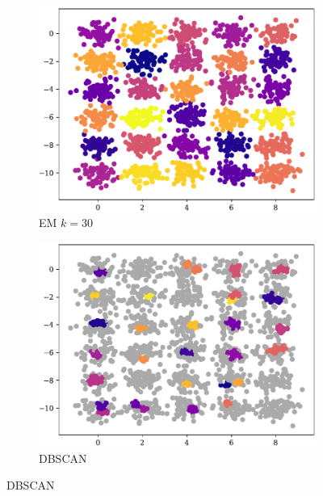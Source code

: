 \begin{figure}[t!]
\begin{subfigure}[b]{0.45\textwidth}
        \includegraphics[width=\textwidth]{../plots/30-30_pred_em.pdf}
        \caption{EM $k = 30$}
        \label{subfig:30-30-em}
    \end{subfigure}
    \hspace{0.09\textwidth}
    \begin{subfigure}[b]{0.45\textwidth}
        \includegraphics[width=\textwidth]{../plots/30-30_pred_dbscan.pdf}
        \caption{DBSCAN}
        \label{subfig:30-30-dbscan}
    \end{subfigure}
\end{figure}

